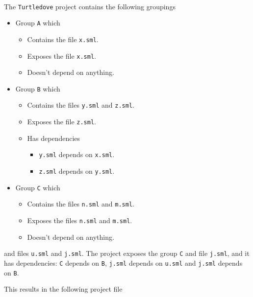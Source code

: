 \begin{example}\ 
  \label{ex:Sample-project-file-turtledove}
  
  The \texttt{Turtledove} project contains the following groupings
  
  \begin{itemize}
  \item Group \texttt{A} which
    \begin{itemize}
    \item Contains the file \texttt{x.sml}.
    \item Exposes the file \texttt{x.sml}.
    \item Doesn't depend on anything.
    \end{itemize}
    
  \item Group \texttt{B} which
    \begin{itemize}
    \item Contains the files \texttt{y.sml} and \texttt{z.sml}.
    \item Exposes the file \texttt{z.sml}.
    \item Has dependencies
      \begin{itemize}
      \item \texttt{y.sml} depends on \texttt{x.sml}.
      \item \texttt{z.sml} depends on \texttt{y.sml}.
      \end{itemize}
    \end{itemize}
    
  \item Group \texttt{C} which
    \begin{itemize}
    \item Contains the files \texttt{n.sml} and \texttt{m.sml}.
    \item Exposes the files \texttt{n.sml} and \texttt{m.sml}.
    \item Doesn't depend on anything.
    \end{itemize}
  \end{itemize}
  
  and files \texttt{u.sml} and \texttt{j.sml}. The project exposes the group
  \texttt{C} and file \texttt{j.sml}, and it has dependencies: \texttt{C}
  depends on \texttt{B}, \texttt{j.sml} depends on \texttt{u.sml} and
  \texttt{j.sml} depends on \texttt{B}.
  
  
  This results in the following project file
  

\end{example}
